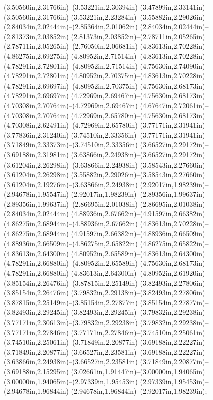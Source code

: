 (3.50560in,2.31766in)--(3.53221in,2.30394in) (3.47899in,2.33141in)--(3.50560in,2.31766in) (3.53221in,2.23284in)--(3.55882in,2.29026in) (2.84034in,2.02444in)--(2.85364in,2.01062in) (2.84034in,2.02444in)--(2.81373in,2.03852in) (2.81373in,2.03852in)--(2.78711in,2.05265in) (2.78711in,2.05265in)--(2.76050in,2.06681in) (4.83613in,2.70228in)--(4.86275in,2.69275in) (4.80952in,2.71514in)--(4.83613in,2.70228in) (4.78291in,2.72801in)--(4.80952in,2.71514in) (4.75630in,2.74090in)--(4.78291in,2.72801in) (4.80952in,2.70375in)--(4.83613in,2.70228in) (4.78291in,2.69697in)--(4.80952in,2.70375in) (4.75630in,2.68173in)--(4.78291in,2.69697in) (4.72969in,2.69467in)--(4.75630in,2.68173in) (4.70308in,2.70764in)--(4.72969in,2.69467in) (4.67647in,2.72061in)--(4.70308in,2.70764in) (4.72969in,2.65780in)--(4.75630in,2.68173in) (4.70308in,2.62491in)--(4.72969in,2.65780in) (3.77171in,2.31941in)--(3.77836in,2.31240in) (3.74510in,2.33356in)--(3.77171in,2.31941in) (3.71849in,2.33373in)--(3.74510in,2.33356in) (3.66527in,2.29172in)--(3.69188in,2.31981in) (3.63866in,2.24938in)--(3.66527in,2.29172in) (3.61204in,2.26298in)--(3.63866in,2.24938in) (3.58543in,2.27660in)--(3.61204in,2.26298in) (3.55882in,2.29026in)--(3.58543in,2.27660in) (3.61204in,2.19276in)--(3.63866in,2.24938in) (2.92017in,1.98239in)--(2.94678in,1.95547in) (2.92017in,1.98239in)--(2.89356in,1.99637in) (2.89356in,1.99637in)--(2.86695in,2.01038in) (2.86695in,2.01038in)--(2.84034in,2.02444in) (4.88936in,2.67662in)--(4.91597in,2.66382in) (4.86275in,2.68944in)--(4.88936in,2.67662in) (4.83613in,2.70228in)--(4.86275in,2.68944in) (4.91597in,2.66382in)--(4.88936in,2.66509in) (4.88936in,2.66509in)--(4.86275in,2.65822in) (4.86275in,2.65822in)--(4.83613in,2.64300in) (4.80952in,2.65589in)--(4.83613in,2.64300in) (4.78291in,2.66880in)--(4.80952in,2.65589in) (4.75630in,2.68173in)--(4.78291in,2.66880in) (4.83613in,2.64300in)--(4.80952in,2.61920in) (3.85154in,2.26476in)--(3.87815in,2.25149in) (3.82493in,2.27806in)--(3.85154in,2.26476in) (3.79832in,2.29138in)--(3.82493in,2.27806in) (3.87815in,2.25149in)--(3.85154in,2.27877in) (3.85154in,2.27877in)--(3.82493in,2.29245in) (3.82493in,2.29245in)--(3.79832in,2.29238in) (3.77171in,2.30613in)--(3.79832in,2.29238in) (3.79832in,2.29238in)--(3.77171in,2.27846in) (3.77171in,2.27846in)--(3.74510in,2.25061in) (3.74510in,2.25061in)--(3.71849in,2.20877in) (3.69188in,2.22227in)--(3.71849in,2.20877in) (3.66527in,2.23581in)--(3.69188in,2.22227in) (3.63866in,2.24938in)--(3.66527in,2.23581in) (3.71849in,2.20877in)--(3.69188in,2.15295in) (3.02661in,1.91447in)--(3.00000in,1.94065in) (3.00000in,1.94065in)--(2.97339in,1.95453in) (2.97339in,1.95453in)--(2.94678in,1.96844in) (2.94678in,1.96844in)--(2.92017in,1.98239in);
